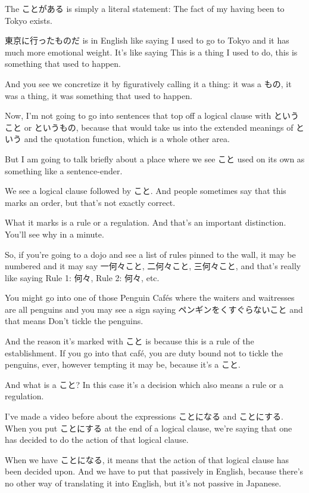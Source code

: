 The ことがある is simply a literal statement: The fact of my having been to Tokyo exists.

東京に行ったものだ is in English like saying I used to go to Tokyo and it has much more emotional weight. It's like saying This is a thing I used to do, this is something that used to happen.

And you see we concretize it by figuratively calling it a thing: it was a もの, it was a thing, it was something that used to happen.

Now, I'm not going to go into sentences that top off a logical clause with ということ or というもの, because that would take us into the extended meanings of という and the quotation function, which is a whole other area.

But I am going to talk briefly about a place where we see こと used on its own as something like a sentence-ender.

We see a logical clause followed by こと. And people sometimes say that this marks an order, but that's not exactly correct.

What it marks is a rule or a regulation. And that's an important distinction. You'll see why in a minute.

{}

So, if you're going to a dojo and see a list of rules pinned to the wall, it may be numbered and it may say 一何々こと, 二何々こと, 三何々こと, and that's really like saying Rule 1: 何々, Rule 2: 何々, etc.

You might go into one of those Penguin Cafés where the waiters and waitresses are all penguins and you may see a sign saying ペンギンをくすぐらないこと and that means Don't tickle the penguins.

{}

And the reason it's marked with こと is because this is a rule of the establishment. If you go into that café, you are duty bound not to tickle the penguins, ever, however tempting it may be, because it's a こと.

And what is a こと? In this case it's a decision which also means a rule or a regulation.

I've made a video before about the expressions ことになる and ことにする. When you put ことにする at the end of a logical clause, we're saying that one has decided to do the action of that logical clause.

When we have ことになる, it means that the action of that logical clause has been decided upon. And we have to put that passively in English, because there's no other way of translating it into English, but it's not passive in Japanese.

